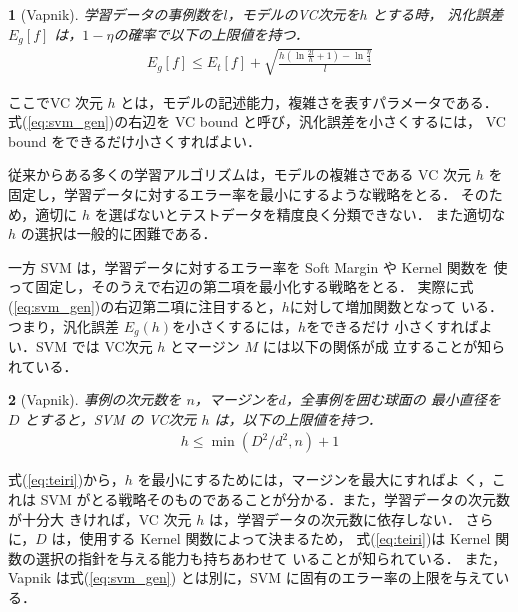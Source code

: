 \newtheorem{theorem}{}
\begin{theorem}[Vapnik]
学習データの事例数を$l$，モデルのVC次元を$h$ とする時，
汎化誤差 $E_g[f]$ は，$1-\eta$の確率で以下の上限値を持つ．
\begin{eqnarray}
E_g [f] \leq E_t[f] + \sqrt{\frac{h(\ln\frac{2l}{h} + 1) - \ln\frac{\eta}{4}}{l}} \label{eq:svm_gen}
\end{eqnarray}
\end{theorem}
ここでVC 次元 $h$ とは，モデルの記述能力，複雑さを表すパラメータである．
式(\ref{eq:svm_gen})の右辺を VC bound と呼び，汎化誤差を小さくするには，
VC bound をできるだけ小さくすればよい．

従来からある多くの学習アルゴリズムは，モデルの複雑さである VC 次元 $h$ を
固定し，学習データに対するエラー率を最小にするような戦略をとる．
そのため，適切に $h$ を選ばないとテストデータを精度良く分類できない．
また適切な $h$ の選択は一般的に困難である．

一方 SVM は，学習データに対するエラー率を Soft Margin や Kernel 関数を
使って固定し，そのうえで右辺の第二項を最小化する戦略をとる．
実際に式(\ref{eq:svm_gen})の右辺第二項に注目すると，$h$に対して増加関数となって
いる．つまり，汎化誤差 $E_g(h)$を小さくするには，$h$をできるだけ
小さくすればよい．SVM では VC次元 $h$ とマージン $M$ には以下の関係が成
立することが知られている\cite{Vapnik98}．

\begin{theorem}[Vapnik]
事例の次元数を $n$，マージンを$d$，全事例を囲む球面の
最小直径を $D$ とすると，SVM の VC次元 $h$ は，以下の上限値を持つ．
\begin{eqnarray}
h \leq \min(D^2/d^2,n) + 1 \label{eq:teiri}
\end{eqnarray}
\end{theorem}

式(\ref{eq:teiri})から，$h$ を最小にするためには，マージンを最大にすればよ
く，これは SVM がとる戦略そのものであることが分かる．また，学習データの次元数が十分大
きければ，VC 次元 $h$ は，学習データの次元数に依存しない．
さらに，$D$ は，使用する Kernel 関数によって決まるため，
式(\ref{eq:teiri})は Kernel 関数の選択の指針を与える能力も持ちあわせて
いることが知られている\cite{Vapnik98}．
また，Vapnik は式(\ref{eq:svm_gen}) とは別に，SVM に固有のエラー率の上限を与えている．

